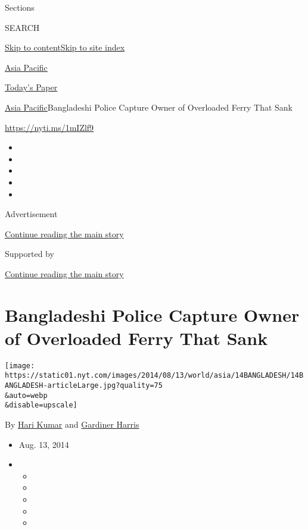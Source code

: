Sections

SEARCH

\protect\hyperlink{site-content}{Skip to
content}\protect\hyperlink{site-index}{Skip to site index}

\href{https://www.nytimes.com/section/world/asia}{Asia Pacific}

\href{https://myaccount.nytimes.com/auth/login?response_type=cookie\&client_id=vi}{}

\href{https://www.nytimes.com/section/todayspaper}{Today's Paper}

\href{/section/world/asia}{Asia Pacific}\textbar{}Bangladeshi Police
Capture Owner of Overloaded Ferry That Sank

\url{https://nyti.ms/1mIZlf9}

\begin{itemize}
\item
\item
\item
\item
\item
\end{itemize}

Advertisement

\protect\hyperlink{after-top}{Continue reading the main story}

Supported by

\protect\hyperlink{after-sponsor}{Continue reading the main story}

\hypertarget{bangladeshi-police-capture-owner-of-overloaded-ferry-that-sank}{%
\section{Bangladeshi Police Capture Owner of Overloaded Ferry That
Sank}\label{bangladeshi-police-capture-owner-of-overloaded-ferry-that-sank}}

\texttt{[image: https://static01.nyt.com/images/2014/08/13/world/asia/14BANGLADESH/14BANGLADESH-articleLarge.jpg?quality=75\\\&auto=webp\\\&disable=upscale]}

By \href{https://www.nytimes.com/by/hari-kumar}{Hari Kumar} and
\href{http://www.nytimes.com/by/gardiner-harris}{Gardiner Harris}

\begin{itemize}
\item
  Aug. 13, 2014
\item
  \begin{itemize}
  \item
  \item
  \item
  \item
  \item
  \end{itemize}
\end{itemize}


